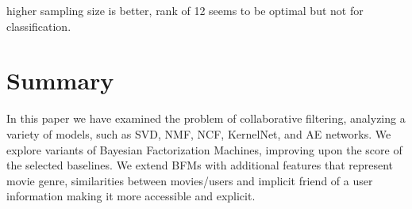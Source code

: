 \documentclass[10pt,conference,compsocconf]{IEEEtran}
\begin{document}
    higher sampling size is better, rank of 12 seems to be optimal but not for classification.


    \section{Summary}

    In this paper we have examined the problem of collaborative filtering, analyzing a variety of models, such as SVD, NMF, NCF, KernelNet, and AE networks.
    We explore variants of Bayesian Factorization Machines, improving upon the score of the selected baselines.
    We extend BFMs with additional features that represent movie genre, similarities between movies/users and implicit friend of a user information making it more accessible and explicit.



    \balance
    
    
\end{document}
